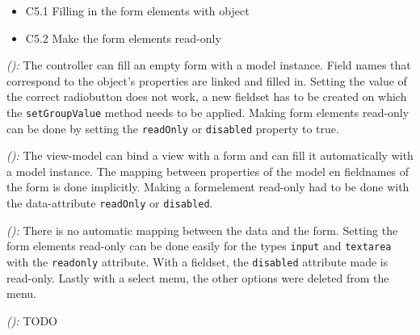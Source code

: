 \documentclass[a4paper]{artikel3}
\newcommand{\code}[1]{\texttt{#1}}
\newcommand{\setspace}[0]{\vspace{2mm}}
\renewcommand{\paragraph}[1]{\setspace \noindent {\bf #1}  }
\newcommand{\framework}[2]{ \emph{#1 (\textbf{#2}): }} %
\newcommand{\challenge}[1]{\paragraph{#1}}
\begin{document}

\challenge{\chal{vullen}}
\begin{itemize}
  \item C5.1 Filling in the form elements with object
  \item C5.2 Make the form elements read-only
\end{itemize}

\framework{\sta{}}{}
The controller can fill an empty form with a model instance.
Field names that correspond to the object's properties are linked and filled in.
Setting the value of the correct radiobutton does not work,  a new fieldset has to be created on which the \code{setGroupValue} method needs to be applied.  
Making form elements read-only can be done by setting the \code{readOnly} or \code{disabled} property to true.

\framework{\kendoa{}}{}
The view-model can bind a view with a form and can fill it automatically with a model instance.
The mapping between properties of the model en fieldnames of the form is done implicitly.
Making a formelement read-only had to be done with the data-attribute \code{readOnly} or \code{disabled}.

\framework{\jqma{}}{}
There is no automatic mapping between the data and the form.
Setting the form elements read-only can be done easily for the types \code{input} and \code{textarea} with the \code{readonly} attribute.
With a fieldset, the \code{disabled} attribute made is read-only.
Lastly with a select menu, the other options were deleted from the menu.

\framework{\lungoa{}}{}
TODO


% 
% 
% 
\end{document}
